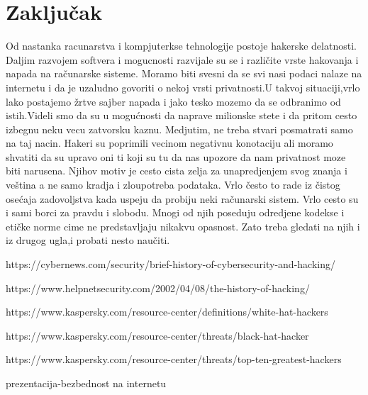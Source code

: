 \documentclass[a4paper]{article}
\begin{document}
\section{Zaključak}
\label{sec:zakljucak}
Od nastanka racunarstva i kompjuterkse tehnologije postoje hakerske delatnosti. Daljim razvojem softvera i mogucnosti razvijale su se i različite vrste hakovanja i napada na računarske sisteme. Moramo biti svesni da se svi nasi podaci nalaze na internetu i da je uzaludno govoriti o nekoj vrsti privatnosti.U takvoj situaciji,vrlo lako postajemo žrtve sajber napada i jako tesko mozemo da se odbranimo od istih.Videli smo da su u mogućnosti da naprave milionske stete i da pritom cesto izbegnu neku vecu zatvorsku kaznu.
\newline
Medjutim, ne treba stvari posmatrati samo na taj nacin. Hakeri su poprimili vecinom negativnu konotaciju ali moramo shvatiti da su upravo oni ti koji su tu da nas upozore da nam privatnost moze biti narusena. Njihov motiv je cesto cista zelja za unapredjenjem svog znanja i veština a ne samo kradja i zloupotreba podataka. Vrlo često to rade iz čistog osećaja zadovoljstva kada uspeju da probiju neki računarski sistem. Vrlo cesto su i sami borci za pravdu i slobodu. Mnogi od njih poseduju odredjene kodekse i etičke norme cime ne predstavljaju nikakvu opasnost. Zato treba gledati na njih i iz drugog ugla,i probati nesto naučiti.
 

\newpage


\appendix

\begin{thebibliography}{9}

 https://cybernews.com/security/brief-history-of-cybersecurity-and-hacking/

 https://www.helpnetsecurity.com/2002/04/08/the-history-of-hacking/

 https://www.kaspersky.com/resource-center/definitions/white-hat-hackers

 https://www.kaspersky.com/resource-center/threats/black-hat-hacker

  https://www.kaspersky.com/resource-center/threats/top-ten-greatest-hackers

 prezentacija-bezbednost na internetu


\end{thebibliography}




\appendix
\end{document}
